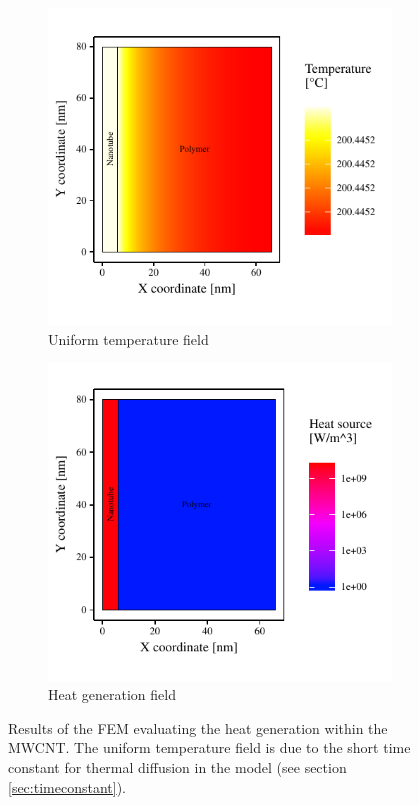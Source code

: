 \documentclass[11pt,review,times]{article}
\begin{document}
\begin{figure}[htb]
	\centering
	\captionsetup{width=\textwidth}
	\begin{subfigure}{0.49\textwidth}
		\centering
		\captionsetup{width=0.9\textwidth}
		\includegraphics[width=\textwidth]{resultats_comsol_axisymetrique_temp}
		\caption{Uniform temperature field}
		\label{fig:temp_axysymmetric}
	\end{subfigure}
	\begin{subfigure}{0.49\textwidth}
		\centering
		\captionsetup{width=0.9\textwidth}
		\includegraphics[width=\textwidth]{resultats_comsol_axisymetrique_puissance}
		\caption{Heat generation field}
		\label{fig:heat_axysymmetric}
	\end{subfigure}%
	\caption{Results of the FEM evaluating the heat generation within the MWCNT. The uniform temperature field is due to the short time constant for thermal diffusion in the model (see section \ref{sec:timeconstant}). \cite{Brassard2018_figshare_article1}}
	\label{fig:results_axysymmetric}
\end{figure}
\end{document}
